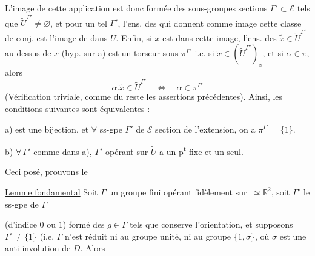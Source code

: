 
L'image de cette application est donc formée des  sous-groupes sections $\Gamma'\subset\mathcal E$ tels que $\widetilde U^{\Gamma'}\ne\varnothing$, et pour un tel $\Gamma'$, l'ens. des  qui  donnent comme image cette classe de conj. est l'image de  dans $U$. Enfin, si $x$ est dans cette image, l'ens. des $\widetilde x\in\widetilde U^{\Gamma'}$ au dessus de $x$ \deleted{\unsure{$\ne\varnothing$}} (hyp. sur a) est un torseur sous $\pi^{\Gamma'}$ i.e. si $\widetilde x\in(\widetilde U^{\Gamma'})_x$,  et si $\alpha\in\pi$, alors
\[
\alpha.\widetilde x\in\widetilde U^{\Gamma'}\quad\Longleftrightarrow\quad\alpha\in\pi^{\Gamma'}
\]
(Vérification triviale, comme du reste  les assertions précédentes). Ainsi, les conditions suivantes sont équivalentes :


 a) \unsure{$\varphi$} est une bijection, et $\forall$ ss-gpe $\Gamma'$ de $\mathcal E$ section de l'extension,  on a $\pi^{\Gamma'}=\{1\}$.

 b) $\forall\,\Gamma'$ comme dans a), $\Gamma'$ opérant sur $\widetilde U$ a un p\textsuperscript{t} fixe et un seul.

Ceci posé, prouvons le

\uline{Lemme fondamental} Soit $\Gamma$ un groupe  fini opérant fidèlement sur  \,$\simeq\mathbb R^2$, soit  $\Gamma^\circ$ le ss-gpe de $\Gamma$



(d'indice $0$ ou $1$) formé des $g\in\Gamma$ tels que  conserve l'orientation, et supposons $\Gamma^\circ\ne\{1\}$ (i.e. $\Gamma$ n'est réduit ni au groupe unité, ni au groupe  $\{1,\sigma\}$, où $\sigma$ est une anti-involution de $D$. Alors

